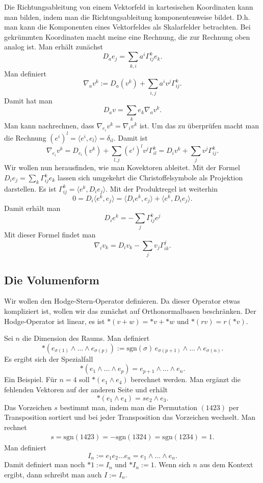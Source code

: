 \documentclass[a4paper,10pt,fleqn,twocolumn,twoside]{article}
\begin{document}
Die Richtungsableitung von einem Vektorfeld in kartesischen
Koordinaten kann man bilden, indem man die Richtungsableitung
komponentenweise bildet. D.h. man kann die Komponenten eines
Vektorfeldes als Skalarfelder betrachten. Bei gekrümmten Koordinaten
macht meine eine Rechnung, die zur Rechnung oben analog ist.
Man erhält zunächst
\[D_a e_j = \sum_{k,i}a^i \Gamma_{ij}^k e_k.\]
Man definiert
\[\nabla_a v^k := D_a(v^k) + \sum_{i,j}a^i v^j \Gamma_{ij}^k.\]
Damit hat man
\[D_a v = \sum_k e_k \nabla_a v^k.\]
%
Man kann nachrechnen, dass $\nabla_{e_i}v^k=\nabla_i v^k$ ist.
Um das zu überprüfen macht man die Rechnung
$(e^i)^l = \langle e^i,e_l\rangle = \delta_{il}.$
Damit ist
\[\nabla_{e_i} v^k = D_{e_i}(v^k)
+ \sum_{l,j}(e^i)^l v^j \Gamma_{il}^k
= D_i v^k + \sum_{j} v^j\Gamma_{ij}^k.\]
Wir wollen nun herausfinden, wie man Kovektoren ableitet.
Mit der Formel $D_ie_j=\sum_k\Gamma_{ij}^k e_k$ lassen sich
umgekehrt die Christoffelsymbole als Projektion darstellen. Es ist
$\Gamma_{ij}^k = \langle e^k,D_ie_j\rangle.$
Mit der Produktregel ist weiterhin
\[0=D_i\langle e^k,e_j\rangle
= \langle D_ie^k,e_j\rangle + \langle e^k,D_ie_j\rangle.\]
Damit erhält man
\[D_ie^k = -\sum_{j}\Gamma_{ij}^ke^j\]
Mit dieser Formel findet man
\[\nabla_i v_k = D_iv_k-\sum_{j}v_j\Gamma_{ik}^j.\]

\subsection{Die Volumenform}

Wir wollen den Hodge-Stern-Operator definieren. Da dieser Operator
etwas kompliziert ist, wollen wir das zunächst auf Orthonormalbasen
beschränken. Der Hodge-Operator ist linear, es ist
$*(v+w) = *v+*w$ und $*(rv)=r(*v)$.

Sei $n$ die Dimension des Raums. Man definiert
\[*(e_{\sigma(1)}\wedge\ldots\wedge e_{\sigma(p)})
:= \mathrm{sgn}(\sigma)\,e_{\sigma(p+1)}\wedge\ldots\wedge e_{\sigma(n)}.\]
Es ergibt sich der Spezialfall
\[*(e_1\wedge\ldots\wedge e_p) = e_{p+1}\wedge\ldots\wedge e_n.\]
Ein Beispiel. Für $n=4$ soll $*(e_1\wedge e_4)$
berechnet werden. Man ergänzt die fehlenden Vektoren
auf der anderen Seite und erhält
\[*(e_1\wedge e_4) = se_2\wedge e_3.\]
Das Vorzeichen $s$ bestimmt man, indem man die Permutation
$(1423)$ per Transposition sortiert und bei jeder Transposition
das Vorzeichen wechselt. Man rechnet
\begin{gather*}
s = \mathrm{sgn}(1423)=-\mathrm{sgn}(1324) = \mathrm{sgn}(1234) = 1.
\end{gather*}
Man definiert
\[I_n := e_1e_2\ldots e_n = e_1\wedge\ldots\wedge e_n.\]
Damit definiert man noch $*1:=I_n$ und $*I_n:=1$.
Wenn sich $n$ aus dem Kontext ergibt, dann schreibt man auch $I:=I_n$.
\end{document}
